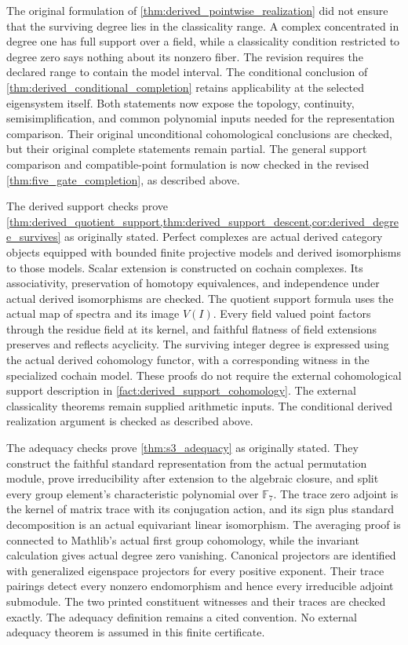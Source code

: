 \documentclass[11pt]{amsart}
\theoremstyle{definition}
\theoremstyle{remark}
\newcommand{\FF}{\mathbb F}
\begin{document}
The original formulation of \cref{thm:derived_pointwise_realization} did not ensure that the surviving degree lies in the classicality range. A complex concentrated in degree one has full support over a field, while a classicality condition restricted to degree zero says nothing about its nonzero fiber. The revision requires the declared range to contain the model interval. The conditional conclusion of \cref{thm:derived_conditional_completion} retains applicability at the selected eigensystem itself. Both statements now expose the topology, continuity, semisimplification, and common polynomial inputs needed for the representation comparison. Their original unconditional cohomological conclusions are checked, but their original complete statements remain partial. The general support comparison and compatible-point formulation is now checked in the revised \cref{thm:five_gate_completion}, as described above.

The derived support checks prove \cref{thm:derived_quotient_support,thm:derived_support_descent,cor:derived_degree_survives} as originally stated. Perfect complexes are actual derived category objects equipped with bounded finite projective models and derived isomorphisms to those models. Scalar extension is constructed on cochain complexes. Its associativity, preservation of homotopy equivalences, and independence under actual derived isomorphisms are checked. The quotient support formula uses the actual map of spectra and its image \(V(I)\). Every field valued point factors through the residue field at its kernel, and faithful flatness of field extensions preserves and reflects acyclicity. The surviving integer degree is expressed using the actual derived cohomology functor, with a corresponding witness in the specialized cochain model. These proofs do not require the external cohomological support description in \cref{fact:derived_support_cohomology}. The external classicality theorems remain supplied arithmetic inputs. The conditional derived realization argument is checked as described above.

The adequacy checks prove \cref{thm:s3_adequacy} as originally stated. They construct the faithful standard representation from the actual permutation module, prove irreducibility after extension to the algebraic closure, and split every group element's characteristic polynomial over \(\FF_7\). The trace zero adjoint is the kernel of matrix trace with its conjugation action, and its sign plus standard decomposition is an actual equivariant linear isomorphism. The averaging proof is connected to Mathlib's actual first group cohomology, while the invariant calculation gives actual degree zero vanishing. Canonical projectors are identified with generalized eigenspace projectors for every positive exponent. Their trace pairings detect every nonzero endomorphism and hence every irreducible adjoint submodule. The two printed constituent witnesses and their traces are checked exactly. The adequacy definition remains a cited convention. No external adequacy theorem is assumed in this finite certificate.
\end{document}
